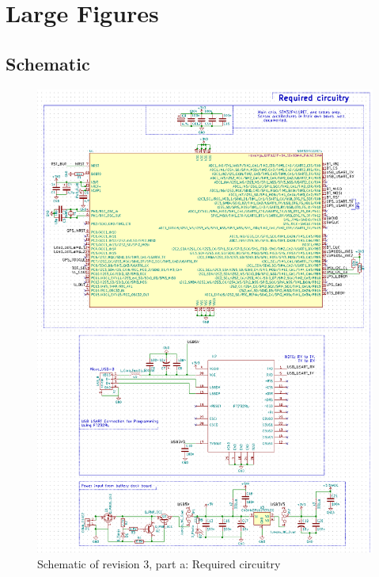 \section{Large Figures}\label{sec:app}

\subsection{Schematic}
\begin{figure}[h]
	\centering
    \includegraphics[width=.9\linewidth]{Figures/schem_r3_a.png}
	\caption{Schematic of revision 3, part a: Required circuitry}
	\label{fig:schr3a}
\end{figure}
